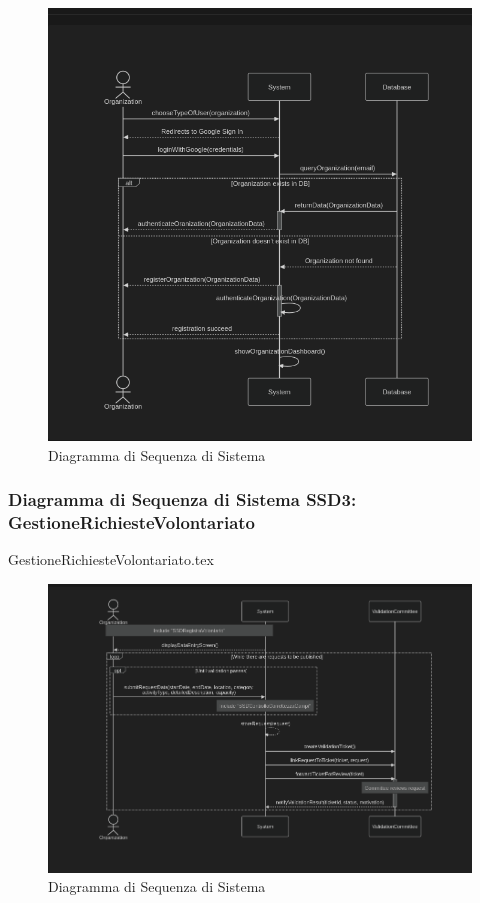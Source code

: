 \documentclass[12pt]{article}
\begin{document}
\begin{figure}[H]
    \includegraphics[width=\textwidth,keepaspectratio]{Immagini/SSD/Iterazione 1/SSDRegistraOrganizzazione.png}
        \caption{Diagramma di Sequenza di Sistema}
        \label{fig:diagrammaSSD2}
\end{figure}

\subsubsection{Diagramma di Sequenza di Sistema SSD3: GestioneRichiesteVolontariato}

{GestioneRichiesteVolontariato.tex}

\begin{figure}[H]
    \includegraphics[width=\textwidth,keepaspectratio]{Immagini/SSD/Iterazione 1/SSDGestioneRichiesteVolontariato.png}
        \caption{Diagramma di Sequenza di Sistema}
        \label{fig:diagrammaSSD3}
\end{figure}
\end{document}
